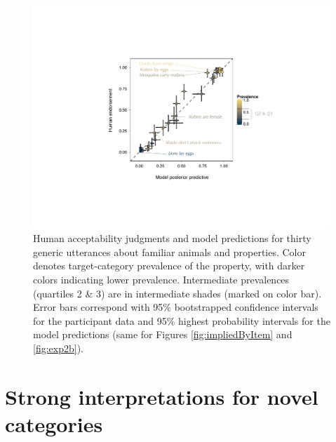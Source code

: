 \documentclass[12pt,letterpaper]{article}
\begin{document}
\begin{figure}
\centering
    \includegraphics[width=0.7\columnwidth]{truthjudge-scatter-wLabels.pdf}
    \caption{Human acceptability judgments and model predictions for thirty generic utterances about familiar animals and properties. 
    Color denotes target-category prevalence of the property, with darker colors indicating lower prevalence. 
    Intermediate prevalences (quartiles 2 \& 3) are in intermediate shades (marked on color bar).
    Error bars correspond with 95\% bootstrapped confidence intervals for the participant data and 95\% highest probability intervals for the model predictions (same for Figures \ref{fig:impliedByItem} and \ref{fig:exp2b}).
    }
  \label{fig:modeldataBars}
\end{figure}


\section*{Strong interpretations for novel categories}
\end{document}

